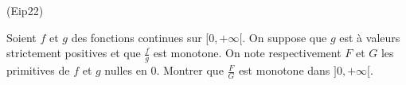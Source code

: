 \begin{tiny}(Eip22)\end{tiny} Soient $f$ et $g$ des fonctions continues sur $[0,+\infty[$. On suppose que $g$ est à valeurs strictement positives et que $\frac{f}{g}$ est monotone. On note respectivement $F$ et $G$ les primitives de $f$ et $g$ nulles en $0$. Montrer que $\frac{F}{G}$ est monotone dans $]0,+\infty[$.